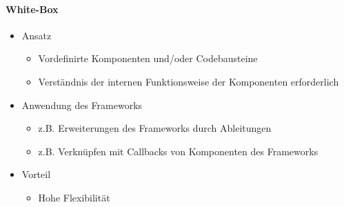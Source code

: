 \documentclass
[
	8pt,		%
	ngerman,	%
	a4paper,	%
	landscape,	%
	final		%
]{extarticle}
\begin{document}
\begin{multicols*}{4}
{\begin{multicols*}{2}
			\paragraph{White-Box}
			\begin{itemize}
				\item Ansatz
				      \begin{itemize}[leftmargin=4pt,nolistsep]
					      \item Vordefinirte Komponenten und/oder Codebausteine
					      \item Verständnis der internen Funktionsweise der Komponenten
					            erforderlich
				      \end{itemize}
				\item Anwendung des Frameworks
				      \begin{itemize}[leftmargin=4pt,nolistsep]
					      \item z.B. Erweiterungen des Frameworks durch Ableitungen
					      \item z.B. Verknüpfen mit Callbacks von Komponenten des Frameworks
				      \end{itemize}
				\item Vorteil
				      \begin{itemize}[leftmargin=4pt,nolistsep]
					      \item Hohe Flexibilität
				      \end{itemize}
			\end{itemize}
		\end{multicols*}
	}

\end{multicols*}
\end{document}

